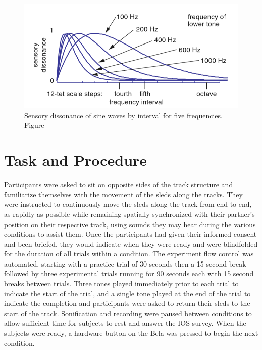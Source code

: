 \documentclass[10pt,a4paper,onecolumn]{article}
\begin{document}
\begin{figure}[h]

{\centering \includegraphics[width=1\linewidth]{figures/setharesTuningTimbreSpectrum2010_p47} 

}

\caption{Sensory dissonance of sine waves by interval for five frequencies. Figure \autocite[p.~47]{setharesSoundSound2005}}\label{fig:sensory-dissonance}
\end{figure}

\hypertarget{task-and-procedure}{%
\section{Task and Procedure}\label{task-and-procedure}}

Participants were asked to sit on opposite sides of the track structure and familiarize themselves with the movement of the sleds along the tracks. They were instructed to continuously move the sleds along the track from end to end, as rapidly as possible while remaining spatially synchronized with their partner's position on their respective track, using sounds they may hear during the various conditions to assist them. Once the participants had given their informed consent and been briefed, they would indicate when they were ready and were blindfolded for the duration of all trials within a condition. The experiment flow control was automated, starting with a practice trial of 30 seconds then a 15 second break followed by three experimental trials running for 90 seconds each with 15 second breaks between trials. Three tones played immediately prior to each trial to indicate the start of the trial, and a single tone played at the end of the trial to indicate the completion and participants were asked to return their sleds to the start of the track. Sonification and recording were paused between conditions to allow sufficient time for subjects to rest and answer the IOS survey. When the subjects were ready, a hardware button on the Bela was pressed to begin the next condition.
\end{document}
